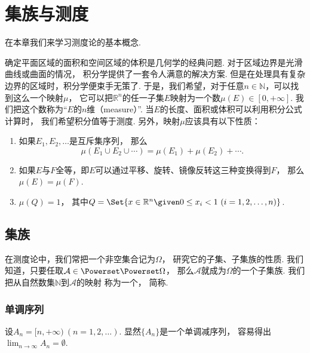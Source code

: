 \chapter{集族与测度}
在本章我们来学习测度论的基本概念.

确定平面区域的面积和空间区域的体积是几何学的经典问题.
对于区域边界是光滑曲线或曲面的情况，
积分学提供了一套令人满意的解决方案.
但是在处理具有复杂边界的区域时，积分学便束手无策了.
于是，我们希望，对于任意\(n\in\mathbb{N}\)，可以找到这么一个映射\(\mu\)，
它可以把\(\mathbb{R}^n\)的任一子集\(E\)映射为一个数\(\mu(E) \in [0,+\infty]\).
我们把这个数称为“\(E\)的\(n\)维（measure）”.
当\(E\)的长度、面积或体积可以利用积分公式计算时，
我们希望积分值等于测度.
另外，映射\(\mu\)应该具有以下性质：\begin{enumerate}
	\item 如果\(E_1,E_2,\dotsc\)是互斥集序列，
	那么\[
		\mu(E_1 \cup E_2 \cup \dotsb)
		= \mu(E_1) + \mu(E_2) + \dotsb.
	\]

	\item 如果\(E\)与\(F\)全等，即\(E\)可以通过平移、旋转、镜像反转这三种变换得到\(F\)，
	那么\(\mu(E) = \mu(F)\).

	\item \(\mu(Q)=1\)，
	其中\(Q = \Set{ x\in\mathbb{R}^n \given 0\leq x_i<1\ (i=1,2,\dotsc,n) }\).
\end{enumerate}

\section{集族}
在测度论中，我们常把一个非空集合记为\(\Omega\)，
研究它的子集、子集族的性质.
我们知道，只要任取\(\mathcal{A} \in \Powerset\Powerset\Omega\)，
那么\(\mathcal{A}\)就成为\(\Omega\)的一个子集族.
我们把从自然数集\(\mathbb{N}\)到\(\mathcal{A}\)的映射
称为一个，
简称.

\subsection{单调序列}
\begin{example}
设\(A_n = [n,+\infty)\ (n=1,2,\dotsc)\).
显然\(\{A_n\}\)是一个单调减序列，
容易得出\(\lim_{n\to\infty} A_n = \emptyset\).
\end{example}

